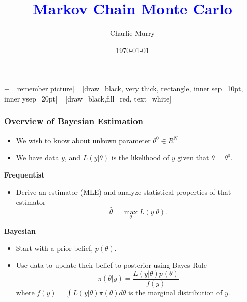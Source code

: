 \documentclass[11pt, aspectratio=169]{beamer}
\title[]{\textcolor{blue}{Markov Chain Monte Carlo}}
\author[CM]{Charlie Murry}
\institute{Boston College}
\date{\today}
\begin{document}
\newcommand\marktopleft[1]{%
    \tikz[overlay,remember picture] 
        \node (marker-#1-a) at (-.3em,.3em) {};%
}
\newcommand\markbottomright[2]{%
    \tikz[overlay,remember picture] 
        \node (marker-#1-b) at (0em,0em) {};%
}
+=[remember picture] 
 =[draw=black, very thick, rectangle, inner sep=10pt, inner ysep=20pt]
 =[draw=black,fill=red, text=white]

\begin{frame}
\maketitle
\end{frame}


\begin{frame}[c]\frametitle{Overview of Bayesian Estimation}
    
\begin{itemize}
    \item We wish to know about unkown parameter $\theta^0\in R^N$
    \item We have data $y$, and $L(y|\theta)$ is the likelihood of $y$ given that $\theta = \theta^0$. 
\end{itemize}    

\textbf{Frequentist}
\begin{itemize}
	\item Derive an estimator (MLE) and analyze statistical properties of that estimator
	$$ \hat{\theta} = \max_{\theta} L(y | \theta).$$
\end{itemize}

\textbf{Bayesian}
\begin{itemize}
	\item Start with a prior belief, $p(\theta)$.
	\item Use data to update their belief  to posterior using Bayes Rule
	$$\pi(\theta | y) = \frac{L(y | \theta) p(\theta)}{f(y)}$$ 
where $f(y) = \int L(y|\theta)\pi(\theta) d\theta$ is the marginal distribution of $y$. 

\end{itemize}

\end{frame}
\end{document}
